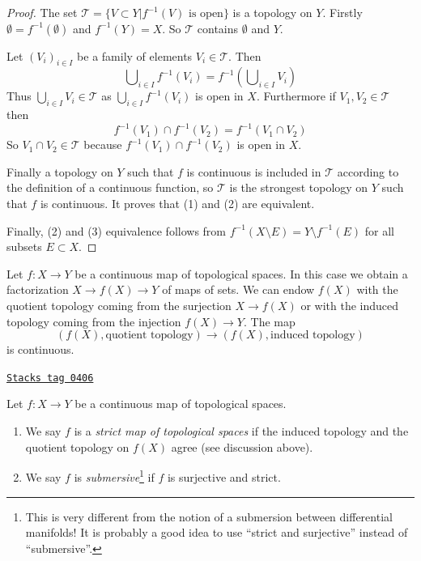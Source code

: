 \begin{proof}
The set $\mathcal{T} = \{V\subset Y | f^{-1}(V) \text{ is open}\}$ is a
topology on $Y$. Firstly $\emptyset = f^{-1}(\emptyset)$ and $f^{-1}(Y) = X$.
So $\mathcal{T}$ contains $\emptyset$ and $Y$.

\medskip\noindent
Let $(V_i)_{i \in I}$ be a family of elements $V_i \in \mathcal{T}$.
Then
$$
\bigcup\nolimits_{i\in I} f^{-1}(V_i) =
f^{-1}\left(\bigcup\nolimits_{i\in I} V_i\right)
$$
Thus $\bigcup_{i\in I} V_i \in \mathcal{T}$ as
$\bigcup_{i\in I}f^{-1}(V_i)$ is open in $X$.
Furthermore if $V_1, V_2 \in \mathcal{T}$ then
$$
f^{-1}(V_1) \cap f^{-1}(V_2) = f^{-1}(V_1 \cap V_2)
$$
So $V_1 \cap V_2 \in \mathcal{T}$ because
$f^{-1}(V_1) \cap f^{-1}(V_2)$ is open in $X$.

\medskip\noindent
Finally a topology on $Y$ such that $f$ is continuous is included in
$\mathcal{T}$ according to the definition of a continuous function, so
$\mathcal{T}$ is the strongest topology on $Y$ such that $f$ is continuous. It
proves that (1) and (2) are equivalent.

\medskip\noindent
Finally, (2) and (3) equivalence follows from $f^{-1}(X\setminus E) = Y
\setminus f^{-1}(E)$ for all subsets $E \subset X$.
\end{proof}

Let $f : X \to Y$ be a continuous map of topological spaces.
In this case we obtain a factorization $X \to f(X) \to Y$
of maps of sets. We can endow $f(X)$ with the
quotient topology coming from the surjection $X \to f(X)$
or with the induced topology coming from the injection $f(X) \to Y$.
The map
$$
(f(X), \text{quotient topology})
\longrightarrow
(f(X), \text{induced topology})
$$
is continuous.

\begin{definition}[Submersive]
\label{topology-definition-submersive}
\href{https://stacks.math.columbia.edu/tag/0406}{\texttt{Stacks tag 0406}}

Let $f : X \to Y$ be a continuous map of topological spaces.
\begin{enumerate}
\item We say $f$ is a {\it strict map of topological spaces}
if the induced topology and the quotient topology on $f(X)$ agree
(see discussion above).
\item We say $f$ is {\it submersive}\footnote{This is very different from
the notion of a submersion between differential manifolds! It is probably
a good idea to use ``strict and surjective'' instead of ``submersive''.}
if $f$ is surjective and strict.
\end{enumerate}
\end{definition}

